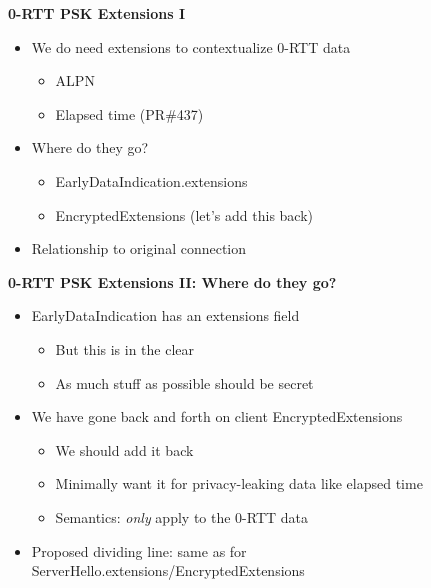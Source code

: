 \documentclass[helvetica]{seminar}
\newcommand{\heading}[1]{%
  \begin{center} 
    \large\bf 
    #1 
  \end{center} 
  \vspace{.4 in}}
\begin{document}
\begin{slide}
\heading{0-RTT PSK Extensions I}

\begin{itemize}
\item We do need extensions to contextualize 0-RTT data
  \begin{itemize}
  \item ALPN
  \item Elapsed time (PR\#437)
  \end{itemize}

\item Where do they go?
  \begin{itemize}
  \item EarlyDataIndication.extensions
  \item EncryptedExtensions (let's add this back)
  \end{itemize}

\item Relationship to original connection
\end{itemize}

\end{slide}


\begin{slide}
\heading{0-RTT PSK Extensions II: Where do they go?}

\begin{itemize}
\item EarlyDataIndication has an extensions field
  \begin{itemize}
  \item But this is in the clear
  \item As much stuff as possible should be secret
  \end{itemize}

\item We have gone back and forth on client EncryptedExtensions
  \begin{itemize}
  \item We should add it back
  \item Minimally want it for privacy-leaking data like elapsed time
  \item Semantics: \emph{only} apply to the 0-RTT data
  \end{itemize}

\item Proposed dividing line: same as for ServerHello.extensions/EncryptedExtensions
\end{itemize}
\end{slide}
\end{document}
